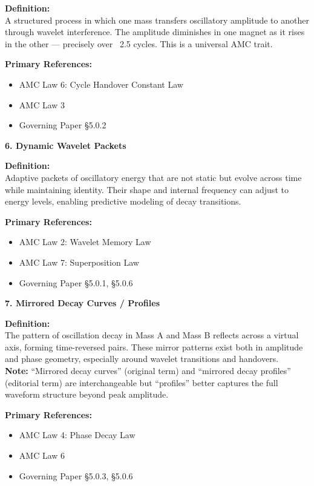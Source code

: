 \documentclass[10pt,aps,pre,onecolumn,superscriptaddress,notitlepage]{revtex4-2}
\begin{document}
\textbf{Definition:} \\
A structured process in which one mass transfers oscillatory amplitude to another through wavelet interference. The amplitude diminishes in one magnet as it rises in the other — precisely over ~2.5 cycles. This is a universal AMC trait.

\textbf{Primary References:}
\begin{itemize}[leftmargin=1.5em]
  \item AMC Law 6: Cycle Handover Constant Law
  \item AMC Law 3
  \item Governing Paper §5.0.2
\end{itemize}

\vspace{1em}

\noindent\textbf{6. Dynamic Wavelet Packets}

\textbf{Definition:} \\
Adaptive packets of oscillatory energy that are not static but evolve across time while maintaining identity. Their shape and internal frequency can adjust to energy levels, enabling predictive modeling of decay transitions.

\textbf{Primary References:}
\begin{itemize}[leftmargin=1.5em]
  \item AMC Law 2: Wavelet Memory Law
  \item AMC Law 7: Superposition Law
  \item Governing Paper §5.0.1, §5.0.6
\end{itemize}

\vspace{1em}

\noindent\textbf{7. Mirrored Decay Curves / Profiles}

\textbf{Definition:} \\
The pattern of oscillation decay in Mass A and Mass B reflects across a virtual axis, forming time-reversed pairs. These mirror patterns exist both in amplitude and phase geometry, especially around wavelet transitions and handovers. \\
\textbf{Note:} “Mirrored decay curves” (original term) and “mirrored decay profiles” (editorial term) are interchangeable but “profiles” better captures the full waveform structure beyond peak amplitude.

\textbf{Primary References:}
\begin{itemize}[leftmargin=1.5em]
  \item AMC Law 4: Phase Decay Law
  \item AMC Law 6
  \item Governing Paper §5.0.3, §5.0.6
\end{itemize}
\end{document}
